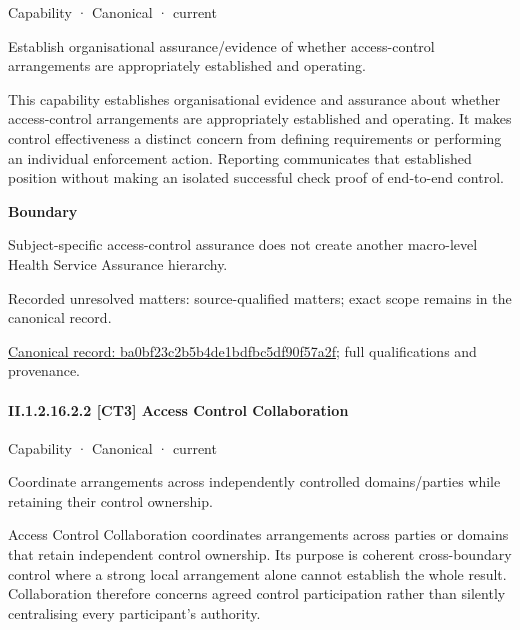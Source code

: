 \label{element:ba0bf23c2b5b4de1bdfbc5df90f57a2f}
{\small Capability · Canonical · current}\par

Establish organisational assurance/evidence of whether access-control arrangements are appropriately established and operating.



This capability establishes organisational evidence and assurance about whether access-control arrangements are appropriately established and operating. It makes control effectiveness a distinct concern from defining requirements or performing an individual enforcement action. Reporting communicates that established position without making an isolated successful check proof of end-to-end control.



\textbf{Boundary}



Subject-specific access-control assurance does not create another macro-level Health Service Assurance hierarchy.


{\small Recorded unresolved matters: source-qualified matters; exact scope remains in the canonical record.}\par
{\footnotesize \href{../../../../continuum/strategy/capability/ba0bf23c2b5b4de1bdfbc5df90f57a2f.md}{Canonical record: ba0bf23c2b5b4de1bdfbc5df90f57a2f}; full qualifications and provenance.}\par
\paragraph*{II.1.2.16.2.2 [CT3] Access Control Collaboration}
\label{navigation:II.1.2.16.2.2}

\label{element:c1a39b83d27a4a148f997c0a709e82ac}
{\small Capability · Canonical · current}\par

Coordinate arrangements across independently controlled domains/parties while retaining their control ownership.



Access Control Collaboration coordinates arrangements across parties or domains that retain independent control ownership. Its purpose is coherent cross-boundary control where a strong local arrangement alone cannot establish the whole result. Collaboration therefore concerns agreed control participation rather than silently centralising every participant's authority.



